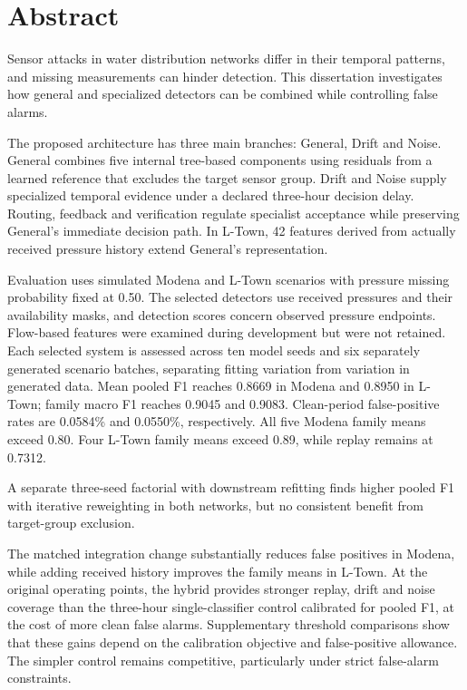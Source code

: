 \chapter*{Abstract}

Sensor attacks in water distribution networks differ in their temporal patterns, and missing measurements can hinder detection. This dissertation investigates how general and specialized detectors can be combined while controlling false alarms.

The proposed architecture has three main branches: General, Drift and Noise. General combines five internal tree-based components using residuals from a learned reference that excludes the target sensor group. Drift and Noise supply specialized temporal evidence under a declared three-hour decision delay. Routing, feedback and verification regulate specialist acceptance while preserving General's immediate decision path. In L-Town, 42 features derived from actually received pressure history extend General's representation.

Evaluation uses simulated Modena and L-Town scenarios with pressure missing probability fixed at 0.50. The selected detectors use received pressures and their availability masks, and detection scores concern observed pressure endpoints. Flow-based features were examined during development but were not retained. Each selected system is assessed across ten model seeds and six separately generated scenario batches, separating fitting variation from variation in generated data. Mean pooled F1 reaches 0.8669 in Modena and 0.8950 in L-Town; family macro F1 reaches 0.9045 and 0.9083. Clean-period false-positive rates are 0.0584\% and 0.0550\%, respectively. All five Modena family means exceed 0.80. Four L-Town family means exceed 0.89, while replay remains at 0.7312.

A separate three-seed factorial with downstream refitting finds higher pooled F1 with iterative reweighting in both networks, but no consistent benefit from target-group exclusion.

The matched integration change substantially reduces false positives in Modena, while adding received history improves the family means in L-Town. At the original operating points, the hybrid provides stronger replay, drift and noise coverage than the three-hour single-classifier control calibrated for pooled F1, at the cost of more clean false alarms. Supplementary threshold comparisons show that these gains depend on the calibration objective and false-positive allowance. The simpler control remains competitive, particularly under strict false-alarm constraints.
